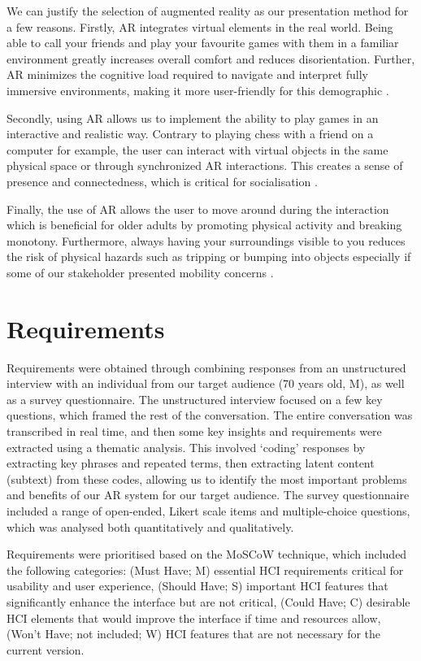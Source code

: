 \documentclass[12pt,a4paper]{article}
\begin{document}
We can justify the selection of augmented reality as our presentation method for a few reasons. Firstly, AR integrates virtual elements in the real world. Being able to call your friends and play your favourite games with them in a familiar environment greatly increases overall comfort and reduces disorientation. Further, AR minimizes the cognitive load required to navigate and interpret fully immersive environments, making it more user-friendly for this demographic \cite{Lee_2023}.

Secondly, using AR allows us to implement the ability to play games in an interactive and realistic way. Contrary to playing chess with a friend on a computer for example, the user can interact with virtual objects in the same physical space or through synchronized AR interactions. This creates a sense of presence and connectedness, which is critical for socialisation \cite{Laine_2022}. 

Finally, the use of AR allows the user to move around during the interaction which is beneficial for older adults by promoting physical activity and breaking monotony. Furthermore, always having your surroundings visible to you reduces the risk of physical hazards such as tripping or bumping into objects especially if some of our stakeholder presented mobility concerns \cite{Drakakis_2023}. 

\section{Requirements}

Requirements were obtained through combining responses from an unstructured interview with an individual from our target audience (70 years old, M), as well as a survey questionnaire. The unstructured interview focused on a few key questions, which framed the rest of the conversation. The entire conversation was transcribed in real time, and then some key insights and requirements were extracted using a thematic analysis. This involved ‘coding’ responses by extracting key phrases and repeated terms, then extracting latent content (subtext) from these codes, allowing us to identify the most important problems and benefits of our AR system for our target audience. The survey questionnaire included a range of open-ended, Likert scale items and multiple-choice questions, which was analysed both quantitatively and qualitatively. 
 

Requirements were prioritised based on the MoSCoW technique, which included the following categories: (Must Have; M) essential HCI requirements critical for usability and user experience, (Should Have; S) important HCI features that significantly enhance the interface but are not critical, (Could Have; C) desirable HCI elements that would improve the interface if time and resources allow, (Won't Have; not included; W) HCI features that are not necessary for the current version.
\end{document}
